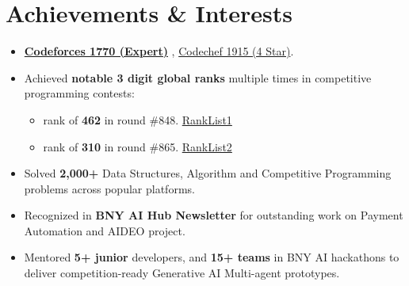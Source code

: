 \documentclass[a4paper,10pt]{article}
\newenvironment{zitemize}{
\begin{itemize}\itemsep0pt \parskip0pt \parsep1pt}
{\end{itemize}\vspace{-0.7cm}}
\begin{document}
\section{Achievements \& Interests}
\vspace{-0.2cm}
\begin{zitemize}
    \item 
    \href{https://codeforces.com/profile/Ruhangrk}{{\textcolor{custompurple}{\textbf{Codeforces 1770 (Expert)}}}}  , 
    \href{https://www.codechef.com/users/ruhang}{{\textcolor{custompurple}{Codechef 1915 (4 Star)}}}.
    
    \item Achieved \textbf{notable 3 digit global ranks} multiple times in competitive programming contests:\vspace{-0.1cm}
    \begin{itemize}
        \item[-] rank of \textbf{462} in round \#848. 
        \href{https://codeforces.com/contest/1778/standings/participant/148805295#p148805295}{{\textcolor{custompurple}{RankList1}}}\vspace{-0.15cm}
        \item[-] rank of \textbf{310} in round \#865. 
        \href{https://codeforces.com/contest/1816/standings/participant/153368764#p153368764}{{\textcolor{custompurple}{RankList2}}} \vspace{-0.1cm}
    \end{itemize}
    
    
    
    \item Solved \textbf{2,000+} Data Structures, Algorithm and Competitive Programming problems across popular platforms.
    \item Recognized in \textbf{BNY AI Hub Newsletter} for outstanding work on Payment Automation and AIDEO project.
    \item Mentored \textbf{5+ junior}  developers, and \textbf{15+ teams } in BNY AI hackathons to deliver competition-ready Generative AI Multi-agent prototypes.

    
    
\end{zitemize}


\end{document}
